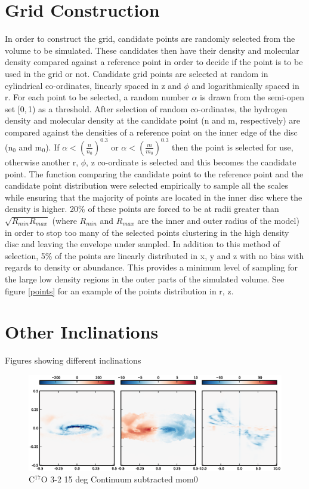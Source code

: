 \documentclass[useAMS,usenatbib]{mn2e}
\begin{document}
\appendix

\section{Grid Construction} \label{sec:gridding} 

In order to construct the grid, candidate points are randomly selected from the volume to be simulated. These candidates then have their density and molecular density compared against a reference point in order to decide if the point is to be used in the grid or not. Candidate grid points are selected at random in cylindrical co-ordinates, linearly spaced in z and $\phi$ and logarithmically spaced in r. For each point to be selected, a random number $\alpha$ is drawn from the semi-open set [0,$\,$1) as a threshold. After selection of random co-ordinates, the hydrogen density and molecular density at the candidate point (n and m, respectively) are compared against the densities of a reference point on the inner edge of the disc (n$_0$ and m$_0$). If $\alpha<\left( \frac{n}{n_0} \right)^{0.3}$ or $\alpha< \left( \frac{m}{m_0} \right)^{0.3}$ then the point is selected for use, otherwise another r, $\phi$, z co-ordinate is selected and this becomes the candidate point. The function comparing the candidate point to the reference point and the candidate point distribution were selected empirically to sample all the scales while ensuring that the majority of points are located in the inner disc where the density is higher. 20\% of these points are forced to be at radii greater than $\sqrt{R_{min}R_{max}}$ (where $R_{min}$ and $R_{max}$ are the inner and outer radius of the model) in order to stop too many of the selected points clustering in the high density disc and leaving the envelope under sampled. In addition to this method of selection, 5\% of the points are linearly distributed in x, y and z with no bias with regards to density or abundance. This provides a minimum level of sampling for the large low density regions in the outer parts of the simulated volume. See figure \ref{points} for an example of the points distribution in r, z. \newline


\section{Other Inclinations} \label{sec:other_inc}

Figures showing different inclinations 
\begin{figure}
 \includegraphics[width=198mm]{Figures/sim/imageC17O_3-2_15deg_all.eps}

 \caption{C$^{17}$O 3-2 15 deg Continuum subtracted mom0}
\end{figure}
\end{document}
